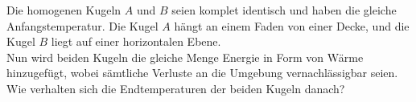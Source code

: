 \begin{minipage}[b]{0.6\textwidth}
\begin{Exercise}[title = Wärmezufuhr, origin = 1. IPhO 1967, difficulty = 4, label = balls]
Die homogenen Kugeln $A$ und $B$ seien komplet identisch und haben die gleiche Anfangstemperatur. Die Kugel $A$ hängt an einem Faden von einer Decke, und die Kugel $B$ liegt auf einer horizontalen Ebene.\\
Nun wird beiden Kugeln die gleiche Menge Energie in Form von Wärme hinzugefügt, wobei sämtliche Verluste an die Umgebung vernachlässigbar seien. Wie verhalten sich die Endtemperaturen der beiden Kugeln danach?
\end{Exercise}
\end{minipage}
\begin{minipage}[t]{0.4\textwidth}
	\centering
\end{minipage}


